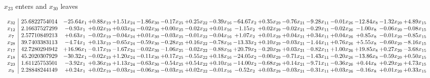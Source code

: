 \documentclass[9pt]{article}
\begin{document}
 $ x_{23} $ enters and $ x_{30} $ leaves 

 \[\begin{array}{c| c c@{\hskip 2pt} c@{\hskip 2pt} c@{\hskip 2pt} c@{\hskip 2pt} c@{\hskip 2pt} c@{\hskip 2pt} c@{\hskip 2pt} c@{\hskip 2pt} c@{\hskip 2pt} c@{\hskip 2pt} c@{\hskip 2pt} c@{\hskip 2pt} c@{\hskip 2pt} c@{\hskip 2pt} c@{\hskip 2pt} }
 x_{32}   &  25.6822754014 & -25.64 x_{1} & +  0.88 x_{19} & +  1.51 x_{24} & -1.86 x_{30} & -0.17 x_{25} & +  0.25 x_{22} & -0.39 x_{16} & -64.67 x_{2} & +  0.35 x_{29} & -0.76 x_{21} & -9.28 x_{11} & -0.01 x_{26} & -12.84 x_{8} & -1.32 x_{20} & +  4.89 x_{15}\\
 x_{12}   &  2.16637527299 & -0.93 x_{1} & +  0.02 x_{19} & +  0.03 x_{24} & -0.02 x_{30} & +  0.00 x_{25} & -0.02 x_{22} & +  0.01 x_{16} & -1.15 x_{2} & +  0.02 x_{29} & -0.02 x_{21} & -0.29 x_{11} & -0.02 x_{26} & -1.00 x_{8} & -0.06 x_{20} & -0.08 x_{15}\\
 x_{7}   &  2.57710849213 & +  0.63 x_{1} & -0.02 x_{19} & -0.04 x_{24} & +  0.01 x_{30} & -0.03 x_{25} & -0.01 x_{22} & -0.04 x_{16} & +  1.07 x_{2} & +  0.01 x_{29} & +  0.04 x_{21} & +  0.34 x_{11} & +  0.04 x_{26} & +  0.85 x_{8} & -0.01 x_{20} & -0.85 x_{15}\\
 x_{28}   &  39.7403383113 & -4.74 x_{1} & +  0.13 x_{19} & -0.65 x_{24} & -0.59 x_{30} & -0.28 x_{25} & +  0.16 x_{22} & -0.78 x_{16} & -13.33 x_{2} & +  0.10 x_{29} & -0.03 x_{21} & -1.44 x_{11} & +  0.76 x_{26} & +  5.55 x_{8} & -0.60 x_{20} & -8.16 x_{15}\\
 x_{17}   &  42.7280294942 & + 16.96 x_{1} & -0.17 x_{19} & -1.67 x_{24} & -0.02 x_{30} & -1.06 x_{25} & -0.02 x_{22} & -0.88 x_{16} & + 20.79 x_{2} & -0.20 x_{29} & +  0.03 x_{21} & -0.82 x_{11} & +  1.00 x_{26} & + 19.85 x_{8} & +  0.27 x_{20} & -3.68 x_{15}\\
 x_{18}   &  45.2020307929 & -30.32 x_{1} & -0.02 x_{19} & +  1.20 x_{24} & -0.11 x_{30} & +  0.17 x_{25} & -0.55 x_{22} & +  0.18 x_{16} & -24.05 x_{2} & -0.00 x_{29} & -0.71 x_{21} & -1.43 x_{11} & -0.20 x_{26} & -13.86 x_{8} & -0.59 x_{20} & +  0.50 x_{15}\\
 x_{23}   &  1.61125753501 & -3.92 x_{1} & +  0.36 x_{19} & +  1.13 x_{24} & -0.63 x_{30} & -0.54 x_{25} & +  0.54 x_{22} & +  0.10 x_{16} & -14.00 x_{2} & -0.68 x_{29} & +  0.14 x_{21} & -9.71 x_{11} & -0.36 x_{26} & +  0.44 x_{8} & +  0.29 x_{20} & +  4.73 x_{15}\\
 x_{9}   &  2.28848244149 & +  0.24 x_{1} & +  0.02 x_{19} & -0.03 x_{24} & -0.06 x_{30} & -0.03 x_{25} & +  0.02 x_{22} & -0.01 x_{16} & -0.52 x_{2} & +  0.03 x_{29} & -0.03 x_{21} & -0.31 x_{11} & +  0.03 x_{26} & -0.16 x_{8} & +  0.01 x_{20} & +  0.33 x_{15}\\

\end{array}\]
\end{document}
